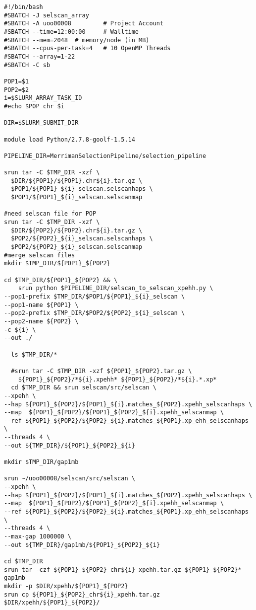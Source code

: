 \documentclass[]{report}
\begin{document}
\begin{verbatim}
#!/bin/bash
#SBATCH -J selscan_array
#SBATCH -A uoo00008         # Project Account
#SBATCH --time=12:00:00     # Walltime
#SBATCH --mem=2048  # memory/node (in MB)
#SBATCH --cpus-per-task=4   # 10 OpenMP Threads
#SBATCH --array=1-22
#SBATCH -C sb

POP1=$1
POP2=$2
i=$SLURM_ARRAY_TASK_ID
#echo $POP chr $i

DIR=$SLURM_SUBMIT_DIR

module load Python/2.7.8-goolf-1.5.14

PIPELINE_DIR=MerrimanSelectionPipeline/selection_pipeline

srun tar -C $TMP_DIR -xzf \
  $DIR/${POP1}/${POP1}.chr${i}.tar.gz \
  $POP1/${POP1}_${i}_selscan.selscanhaps \
  $POP1/${POP1}_${i}_selscan.selscanmap

#need selscan file for POP
srun tar -C $TMP_DIR -xzf \
  $DIR/${POP2}/${POP2}.chr${i}.tar.gz \
  $POP2/${POP2}_${i}_selscan.selscanhaps \
  $POP2/${POP2}_${i}_selscan.selscanmap
#merge selscan files
mkdir $TMP_DIR/${POP1}_${POP2}

cd $TMP_DIR/${POP1}_${POP2} && \
    srun python $PIPELINE_DIR/selscan_to_selscan_xpehh.py \
--pop1-prefix $TMP_DIR/$POP1/${POP1}_${i}_selscan \
--pop1-name ${POP1} \
--pop2-prefix $TMP_DIR/$POP2/${POP2}_${i}_selscan \
--pop2-name ${POP2} \
-c ${i} \
--out ./
  
  ls $TMP_DIR/*
  
  #srun tar -C $TMP_DIR -xzf ${POP1}_${POP2}.tar.gz \
    ${POP1}_${POP2}/*${i}.xpehh* ${POP1}_${POP2}/*${i}.*.xp*
  cd $TMP_DIR && srun selscan/src/selscan \
--xpehh \
--hap ${POP1}_${POP2}/${POP1}_${i}.matches_${POP2}.xpehh_selscanhaps \
--map  ${POP1}_${POP2}/${POP1}_${POP2}_${i}.xpehh_selscanmap \
--ref ${POP1}_${POP2}/${POP2}_${i}.matches_${POP1}.xp_ehh_selscanhaps  \
--threads 4 \
--out ${TMP_DIR}/${POP1}_${POP2}_${i}

mkdir $TMP_DIR/gap1mb

srun ~/uoo00008/selscan/src/selscan \
--xpehh \
--hap ${POP1}_${POP2}/${POP1}_${i}.matches_${POP2}.xpehh_selscanhaps \
--map  ${POP1}_${POP2}/${POP1}_${POP2}_${i}.xpehh_selscanmap \
--ref ${POP1}_${POP2}/${POP2}_${i}.matches_${POP1}.xp_ehh_selscanhaps  \
--threads 4 \
--max-gap 1000000 \
--out ${TMP_DIR}/gap1mb/${POP1}_${POP2}_${i}

cd $TMP_DIR
srun tar -czf ${POP1}_${POP2}_chr${i}_xpehh.tar.gz ${POP1}_${POP2}* gap1mb
mkdir -p $DIR/xpehh/${POP1}_${POP2}
srun cp ${POP1}_${POP2}_chr${i}_xpehh.tar.gz $DIR/xpehh/${POP1}_${POP2}/
\end{verbatim}
\end{document}
